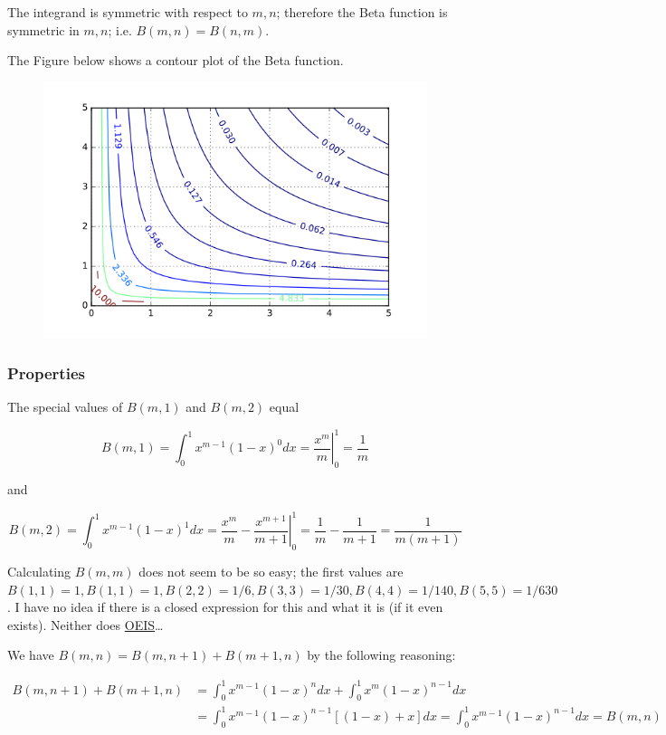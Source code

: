 The integrand is symmetric with respect to \(m,n\); therefore the Beta
function is symmetric in \(m,n\); i.e. \(B(m,n) = B(n,m)\).

The Figure below shows a contour plot of the Beta function.

\begin{figure}[H]
\centering
\includegraphics{images/interesting_integrals_05_3.png}
\end{figure}

\subsubsection{Properties}

The special values of \(B(m,1)\) and \(B(m,2)\) equal

\[
B(m,1) = \int_0^1 x^{m-1} (1-x)^0 dx = \left. \frac{x^m}{m} \right|_0^1 = \frac{1}{m}
\]

and

\[
B(m,2) = \int_0^1 x^{m-1} (1-x)^1 dx = \left. \frac{x^m}{m} - \frac{x^{m+1}}{m+1} \right|_0^1 = \frac{1}{m} - \frac{1}{m+1} = \frac{1}{m(m+1)}
\]

Calculating \(B(m,m)\) does not seem to be so easy; the first values are
\(B(1,1)=1, B(1,1)=1, B(2,2)=1/6, B(3,3)=1/30, B(4,4)=1/140, B(5,5)=1/630\).
I have no idea if there is a closed expression for this and what it is
(if it even exists). Neither does
\href{https://oeis.org/search?q=1\%2C6\%2C30\%2C140\%2C630\&language=german\&go=Suche}{OEIS}\ldots{}

We have \(B(m,n) = B(m,n+1) + B(m+1,n)\) by the following reasoning:

\begin{align*}
  B(m,n+1) + B(m+1,n) &= \int_0^1 x^{m-1} (1-x)^{n} dx + \int_0^1 x^{m} (1-x)^{n-1} dx \\
               &= \int_0^1 x^{m-1} (1-x)^{n-1} \left[(1-x) + x\right] dx = \int_0^1 x^{m-1} (1-x)^{n-1} dx = B(m,n)
\end{align*}

